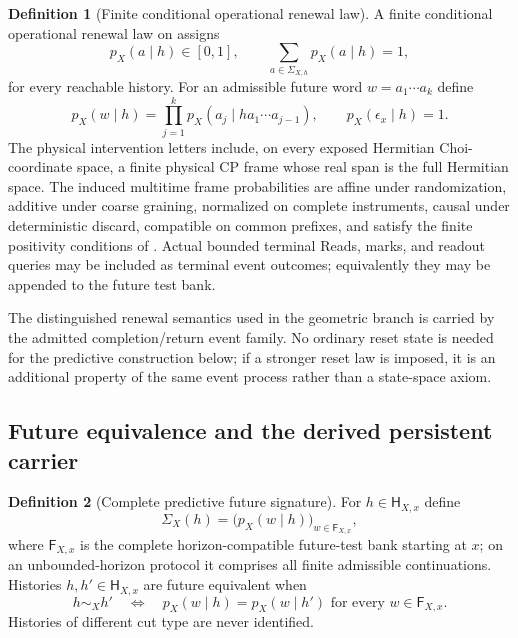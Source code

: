 \documentclass[11pt]{article}
\numberwithin{equation}{section}
\theoremstyle{definition}
\newtheorem{definition}[definition]{Definition}
\theoremstyle{remark}
\newcommand{\CP}{\mathrm{CP}}
\begin{document}
\begin{definition}[Finite conditional operational renewal law]
\label{def:supp-operational-datum}
A finite conditional operational renewal law on
 assigns
\begin{equation}
 p_X(a\mid h)\in[0,1],
 \qquad
 \sum_{a\in\Sigma_{X,h}}p_X(a\mid h)=1,
 \label{eq:supp-one-step-law}
\end{equation}
for every reachable history.  For an admissible future word
$w=a_1\cdots a_k$ define
\begin{equation}
 p_X(w\mid h)
 =\prod_{j=1}^{k}
 p_X(a_j\mid ha_1\cdots a_{j-1}),
 \qquad p_X(\epsilon_x\mid h)=1.
 \label{eq:supp-chain-law}
\end{equation}
The physical intervention letters include, on every exposed Hermitian
Choi-coordinate space, a finite physical $\CP$ frame whose real span is the
full Hermitian space.  The induced multitime frame probabilities are affine
under randomization, additive under coarse graining, normalized on complete
instruments, causal under deterministic discard, compatible on common
prefixes, and satisfy the finite positivity conditions of
.  Actual bounded terminal Reads, marks, and
readout queries may be included as terminal event outcomes; equivalently they
may be appended to the future test bank.
\end{definition}

The distinguished renewal semantics used in the geometric branch is carried by
the admitted completion/return event family.  No ordinary reset state is
needed for the predictive construction below; if a stronger reset law is
imposed, it is an additional property of the same event process rather than a
state-space axiom.

\subsection{Future equivalence and the derived persistent carrier}

\begin{definition}[Complete predictive future signature]
\label{def:supp-future-signature}
For $h\in\mathsf H_{X,x}$ define
\begin{equation}
 \Sigma_X(h)=\bigl(p_X(w\mid h)\bigr)_{w\in\mathsf F_{X,x}},
 \label{eq:supp-future-signature}
\end{equation}
where $\mathsf F_{X,x}$ is the complete horizon-compatible future-test bank
starting at $x$; on an unbounded-horizon protocol it comprises all finite
admissible continuations.  Histories $h,h'\in\mathsf H_{X,x}$ are future equivalent when
\begin{equation}
 h\sim_Xh'
 \quad\Longleftrightarrow\quad
 p_X(w\mid h)=p_X(w\mid h')
 \text{ for every }w\in\mathsf F_{X,x}.
 \label{eq:supp-future-equivalence}
\end{equation}
Histories of different cut type are never identified.
\end{definition}
\end{document}

